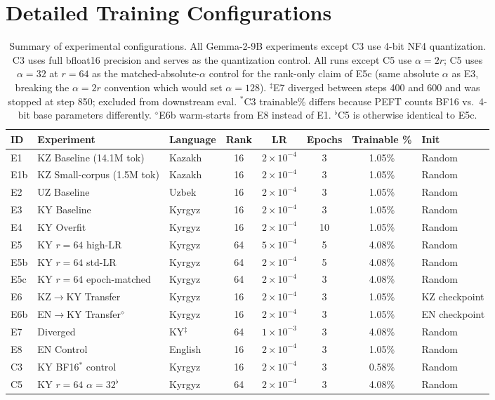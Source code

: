 \documentclass[11pt]{article}
\begin{document}
\section{Detailed Training Configurations}
\label{app:configs}

\begin{table}[!htbp]
\centering
\small
\begin{tabular}{l l l c c c c l}
\toprule
\textbf{ID} & \textbf{Experiment} & \textbf{Language} & \textbf{Rank} & \textbf{LR} & \textbf{Epochs} & \textbf{Trainable \%} & \textbf{Init} \\
\midrule
E1 & KZ Baseline (14.1M tok) & Kazakh & 16 & $2{\times}10^{-4}$ & 3 & 1.05\% & Random \\
E1b & KZ Small-corpus (1.5M tok) & Kazakh & 16 & $2{\times}10^{-4}$ & 3 & 1.05\% & Random \\
E2 & UZ Baseline & Uzbek & 16 & $2{\times}10^{-4}$ & 3 & 1.05\% & Random \\
E3 & KY Baseline & Kyrgyz & 16 & $2{\times}10^{-4}$ & 3 & 1.05\% & Random \\
E4 & KY Overfit & Kyrgyz & 16 & $2{\times}10^{-4}$ & 10 & 1.05\% & Random \\
E5 & KY $r{=}64$ high-LR & Kyrgyz & 64 & $5{\times}10^{-4}$ & 5 & 4.08\% & Random \\
E5b & KY $r{=}64$ std-LR & Kyrgyz & 64 & $2{\times}10^{-4}$ & 5 & 4.08\% & Random \\
E5c & KY $r{=}64$ epoch-matched & Kyrgyz & 64 & $2{\times}10^{-4}$ & 3 & 4.08\% & Random \\
E6 & KZ$\rightarrow$KY Transfer & Kyrgyz & 16 & $2{\times}10^{-4}$ & 3 & 1.05\% & KZ checkpoint \\
E6b & EN$\rightarrow$KY Transfer$^\diamond$ & Kyrgyz & 16 & $2{\times}10^{-4}$ & 3 & 1.05\% & EN checkpoint \\
E7 & Diverged & KY$^\ddagger$ & 64 & $1{\times}10^{-3}$ & 3 & 4.08\% & Random \\
E8 & EN Control & English & 16 & $2{\times}10^{-4}$ & 3 & 1.05\% & Random \\
C3 & KY BF16$^\ast$ control & Kyrgyz & 16 & $2{\times}10^{-4}$ & 3 & 0.58\% & Random \\
C5 & KY $r{=}64$ $\alpha{=}32$$^\flat$ & Kyrgyz & 64 & $2{\times}10^{-4}$ & 3 & 4.08\% & Random \\
\bottomrule
\end{tabular}
\caption{Summary of experimental configurations. All Gemma-2-9B experiments except C3 use 4-bit NF4 quantization. C3 uses full bfloat16 precision and serves as the quantization control. All runs except C5 use $\alpha = 2r$; C5 uses $\alpha{=}32$ at $r{=}64$ as the matched-absolute-$\alpha$ control for the rank-only claim of E5c (same absolute $\alpha$ as E3, breaking the $\alpha{=}2r$ convention which would set $\alpha{=}128$). $^\ddagger$E7 diverged between steps 400 and 600 and was stopped at step 850; excluded from downstream eval. $^\ast$C3 trainable\% differs because PEFT counts BF16 vs.\ 4-bit base parameters differently. $^\diamond$E6b warm-starts from E8 instead of E1. $^\flat$C5 is otherwise identical to E5c.}
\label{tab:experiments}
\end{table}
\end{document}

